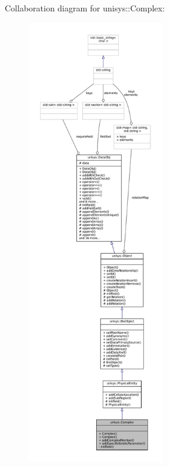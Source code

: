 Collaboration diagram for unisys\-:\-:Complex\-:
\nopagebreak
\begin{figure}[H]
\begin{center}
\leavevmode
\includegraphics[height=550pt]{classunisys_1_1Complex__coll__graph}
\end{center}
\end{figure}
